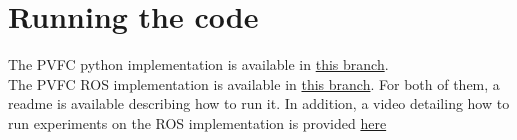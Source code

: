 \section{Running the code}
The PVFC python implementation is available in \href{https://github.com/bsbretly/pvfc_sim/tree/devel-beta_error}{this branch}.\\
The PVFC ROS implementation is available in \href{https://github.com/bsbretly/pvfc_ws/tree/jonas-pcl}{this branch}.
For both of them, a readme is available describing how to run it. 
In addition, a video detailing how to run experiments on the ROS implementation is provided \href{https://github.com/bsbretly/pvfc_ws/tree/jonas-pcl}{here}